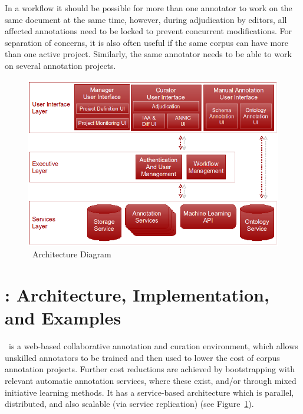 In a workflow it should be possible for more than one annotator to work on the same document at the same time, however, during adjudication by editors, all affected annotations need to be locked to prevent concurrent modifications. For separation of concerns, it is also often useful if the same corpus can have more than one active project. Similarly, the same annotator needs to be able to work on several annotation projects. 

\begin{figure}[tbh!]
\begin{center}
\includegraphics[scale=0.4]{teamware-arch-anon.png}
\caption{\teamware\ Architecture Diagram} \label{fig:architecture}
\end{center}
\end{figure}

\section{\teamware: Architecture, Implementation, and Examples}\label{sect:teamware}

\teamware\ is a web-based collaborative annotation and curation environment, which allows unskilled annotators to be trained and then used to lower the cost of corpus annotation projects. Further cost reductions are achieved by bootstrapping with relevant automatic annotation services, where these exist, and/or through mixed initiative learning methods. It has a service-based architecture which is parallel, distributed, and also scalable (via service replication) (see Figure~\ref{fig:architecture}). 

